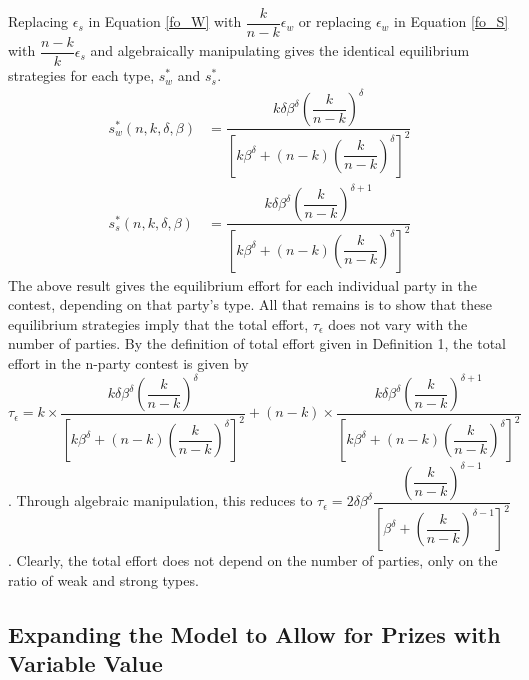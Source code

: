 \documentclass[12pt]{article}
\begin{document}
\begin{appendix}
Replacing $\epsilon_s$ in Equation \ref{fo_W} with $\dfrac{k}{n-k}\epsilon_w$ or replacing $\epsilon_w$ in Equation \ref{fo_S} with $\dfrac{n-k}{k}\epsilon_s$ and algebraically manipulating gives the identical equilibrium strategies for each type, $s^*_w$ and $s^*_s$.
\begin{align}
s^*_w(n, k, \delta, \beta) &= \dfrac{k\delta\beta^\delta(\dfrac{k}{n-k})^\delta}{[k\beta^\delta + (n-k)(\dfrac{k}{n-k})^\delta]^2} \\
s^*_s(n, k, \delta, \beta) &= \dfrac{k\delta\beta^\delta(\dfrac{k}{n-k})^{\delta+1}}{[k\beta^\delta + (n-k)(\dfrac{k}{n-k})^\delta]^2}
\end{align}
The above result gives the equilibrium effort for each individual party in the contest, depending on that party's type. All that remains is to show that these equilibrium strategies imply that the total effort, $\tau_\epsilon$ does not vary with the number of parties. By the definition of total effort given in Definition 1, the total effort in the n-party contest is given by $\tau_\epsilon = k \times \dfrac{k\delta\beta^\delta(\dfrac{k}{n-k})^\delta}{[k\beta^\delta + (n-k)(\dfrac{k}{n-k})^\delta]^2} + (n - k) \times \dfrac{k\delta\beta^\delta(\dfrac{k}{n-k})^{\delta+1}}{[k\beta^\delta + (n-k)(\dfrac{k}{n-k})^\delta]^2}$. Through algebraic manipulation, this reduces to $\tau_\epsilon = 2\delta\beta^\delta\dfrac{(\dfrac{k}{n-k})^{\delta - 1}}{[\beta^\delta + (\dfrac{k}{n-k})^{\delta-1}]^2}$. Clearly, the total effort does not depend on the number of parties, only on the ratio of weak and strong types.

\subsection{Expanding the Model to Allow for Prizes with Variable Value}


\end{appendix}
\end{document}
